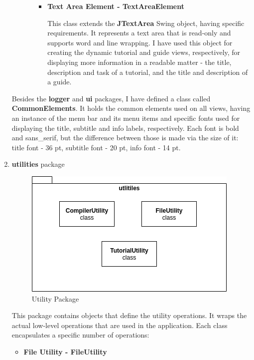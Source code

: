 \documentclass[12pt,a4paper,twoside]{report}
\begin{document}
\begin{enumerate}
\begin{itemize}
\begin{itemize}
\begin{itemize}
\item \textbf{Text Area Element - TextAreaElement}

	This class extends the \textbf{JTextArea} Swing object, having specific requirements. It represents a text area that is read-only and supports word and line wrapping. I have used this object for creating the dynamic tutorial and guide views, respectively, for displaying more information in a readable matter - the title, description and task of a tutorial, and the title and description of a guide.
	
\end{itemize}
\end{itemize}
\end{itemize}

Besides the \textbf{logger} and \textbf{ui} packages, I have defined a class called \textbf{CommonElements}. It holds the common elements used on all views, having an instance of the menu bar and its menu items and specific fonts used for displaying the title, subtitle and info labels, respectively. Each font is bold and sans\_serif, but the difference between those is made via the size of it: title font - 36 pt, subtitle font - 20 pt, info font - 14 pt. 


\item \textbf{utilities} package

\begin{figure}[H]
    \centering
    \includegraphics[width=0.8\linewidth]{img/UtilityPackage.png}
    \caption{Utility Package}
    \label{fig:conf}
\end{figure}

This package contains objects that define the utility operations. It wraps the actual low-level operations that are used in the application. Each class encapsulates a specific number of operations:
\begin{itemize}
\item \textbf{File Utility - FileUtility}
	

\end{itemize}
\end{enumerate}
\end{document}
